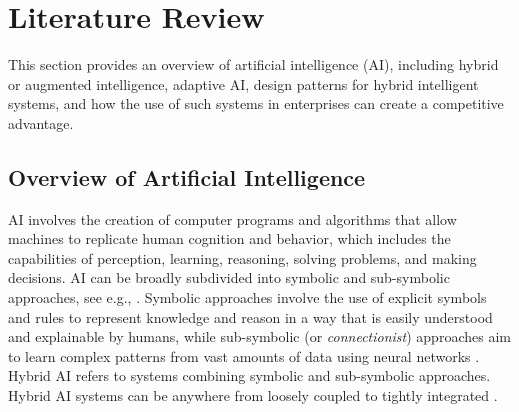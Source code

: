 \section{Literature Review}
\label{sec:literature}

This section provides an overview of artificial intelligence (AI), including hybrid or augmented intelligence,
adaptive AI, design patterns for hybrid intelligent systems, and how the use of such systems in enterprises can
create a competitive advantage.

\subsection{Overview of Artificial Intelligence}

AI involves the creation of computer programs and algorithms that allow machines to replicate human cognition and behavior,
which includes the capabilities of perception, learning, reasoning, solving problems, and making decisions. AI can be broadly
subdivided into symbolic and sub-symbolic approaches, see e.g., \cite{eliasmithSymbolicSubsymbolic2006}. Symbolic approaches
involve the use of explicit symbols and rules to represent knowledge and reason in a way that is easily understood and explainable
by humans, while sub-symbolic (or \textit{connectionist}) approaches aim to learn complex patterns from vast amounts of data
using neural networks \citep{ilkouSymbolicVsSubsymbolic2020}. Hybrid AI refers to systems combining symbolic and sub-symbolic
approaches. Hybrid AI systems can be anywhere from loosely coupled to tightly integrated \citep{garcezNeurosymbolicAI3rd2023}.

